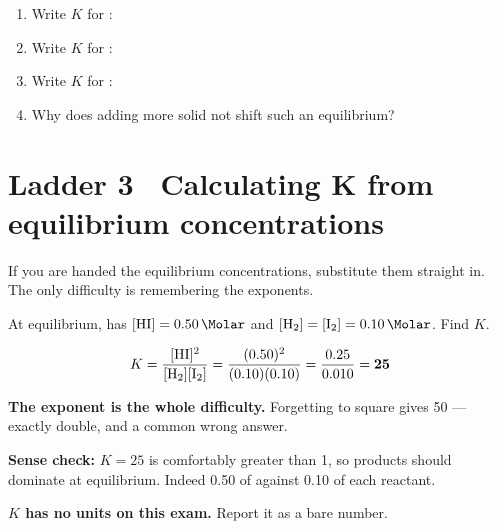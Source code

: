 \documentclass{apchem-worksheet}
\begin{document}
\begin{yourturn}
\begin{enumerate}[leftmargin=*,itemsep=0.5em]
  \item Write $K$ for :
        \workspace[1.6cm]
  \item Write $K$ for : \workspace[1.4cm]
  \item Write $K$ for :
        \workspace[1.6cm]
  \item Why does adding more solid not shift such an equilibrium?
        \workspace[1.8cm]
\end{enumerate}
\end{yourturn}

\section*{\sffamily Ladder 3 \textbullet\ Calculating K from equilibrium concentrations}

If you are handed the equilibrium concentrations, substitute them
straight in. The only difficulty is remembering the exponents.

\begin{workedexample}[I do: substitution]
At equilibrium,  has
$[\ce{HI}] = \SI{0.50}{\Molar}$ and
$[\ce{H2}] = [\ce{I2}] = \SI{0.10}{\Molar}$. Find $K$.

\[ K = \frac{[\ce{HI}]^2}{[\ce{H2}][\ce{I2}]}
     = \frac{(0.50)^2}{(0.10)(0.10)}
     = \frac{0.25}{0.010} = \mathbf{25} \]

\textbf{The exponent is the whole difficulty.} Forgetting to square
 gives \num{50} --- exactly double, and a common wrong answer.

\textbf{Sense check:} $K = 25$ is comfortably greater than 1, so products
should dominate at equilibrium. Indeed \SI{0.50}{\Molar} of 
against \SI{0.10}{\Molar} of each reactant. \checkmark

\textbf{$K$ has no units on this exam.} Report it as a bare number.
\end{workedexample}
\end{document}
